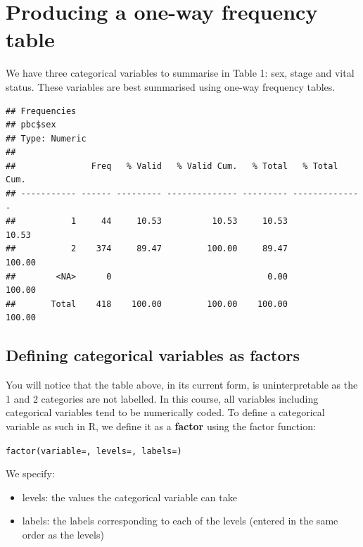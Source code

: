 \documentclass[
]{memoir}
\newenvironment{Shaded}{\begin{snugshade}}{\end{snugshade}}
\newcommand{\FunctionTok}[1]{\textcolor[rgb]{0.00,0.00,0.00}{#1}}
\newcommand{\NormalTok}[1]{#1}
\newcommand{\SpecialCharTok}[1]{\textcolor[rgb]{0.00,0.00,0.00}{#1}}
\providecommand{\tightlist}{%
  \setlength{\itemsep}{0pt}\setlength{\parskip}{0pt}}
\begin{document}
\hypertarget{producing-a-one-way-frequency-table}{%
\section{Producing a one-way frequency table}\label{producing-a-one-way-frequency-table}}

We have three categorical variables to summarise in Table 1: sex, stage and vital status. These variables are best summarised using one-way frequency tables.

\begin{Shaded}
\end{Shaded}

\begin{verbatim}
## Frequencies  
## pbc$sex  
## Type: Numeric  
## 
##               Freq   % Valid   % Valid Cum.   % Total   % Total Cum.
## ----------- ------ --------- -------------- --------- --------------
##           1     44     10.53          10.53     10.53          10.53
##           2    374     89.47         100.00     89.47         100.00
##        <NA>      0                               0.00         100.00
##       Total    418    100.00         100.00    100.00         100.00
\end{verbatim}

\hypertarget{defining-categorical-variables-as-factors}{%
\subsection{Defining categorical variables as factors}\label{defining-categorical-variables-as-factors}}

You will notice that the table above, in its current form, is uninterpretable as the 1 and 2 categories are not labelled. In this course, all variables including categorical variables tend to be numerically coded. To define a categorical variable as such in R, we define it as a \textbf{factor} using the factor function:

\texttt{factor(variable=,\ levels=,\ labels=)}

We specify:

\begin{itemize}
\tightlist
\item
  levels: the values the categorical variable can take
\item
  labels: the labels corresponding to each of the levels (entered in the same order as the levels)
\end{itemize}
\end{document}
